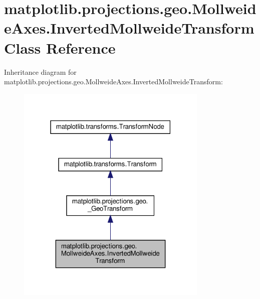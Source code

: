 \hypertarget{classmatplotlib_1_1projections_1_1geo_1_1MollweideAxes_1_1InvertedMollweideTransform}{}\section{matplotlib.\+projections.\+geo.\+Mollweide\+Axes.\+Inverted\+Mollweide\+Transform Class Reference}
\label{classmatplotlib_1_1projections_1_1geo_1_1MollweideAxes_1_1InvertedMollweideTransform}


Inheritance diagram for matplotlib.\+projections.\+geo.\+Mollweide\+Axes.\+Inverted\+Mollweide\+Transform\+:
\nopagebreak
\begin{figure}[H]
\begin{center}
\leavevmode
\includegraphics[width=259pt]{classmatplotlib_1_1projections_1_1geo_1_1MollweideAxes_1_1InvertedMollweideTransform__inherit__graph}
\end{center}
\end{figure}


